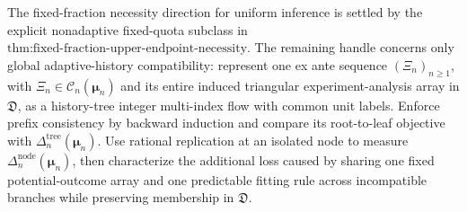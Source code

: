 The fixed-fraction necessity direction for uniform inference is settled by the explicit nonadaptive fixed-quota subclass in \(\text{thm:fixed-fraction-upper-endpoint-necessity}\). The remaining handle concerns only global adaptive-history compatibility: represent one ex ante sequence \((\Xi_n)_{n\ge1}\), with \(\Xi_n\in\mathcal C_n(\boldsymbol\mu_n)\) and its entire induced triangular experiment-analysis array in \(\mathfrak D\), as a history-tree integer multi-index flow with common unit labels. Enforce prefix consistency by backward induction and compare its root-to-leaf objective with \(\Delta_n^{\mathrm{tree}}(\boldsymbol\mu_n)\). Use rational replication at an isolated node to measure \(\Delta_n^{\mathrm{node}}(\boldsymbol\mu_n)\), then characterize the additional loss caused by sharing one fixed potential-outcome array and one predictable fitting rule across incompatible branches while preserving membership in \(\mathfrak D\).